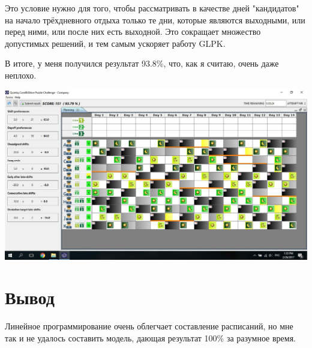 \documentclass[]{article}
\begin{document}
Это условие нужно для того, чтобы рассматривать в качестве дней "кандидатов" на
начало трёхдневного отдыха только те дни, которые являются выходными, или перед
ними, или после них есть выходной. Это сокращает множество допустимых решений,
и тем самым ускоряет работу GLPK.

В итоге, у меня получился результат 93.8\%, что, как я считаю, очень даже неплохо.

\includegraphics[scale=0.5]{bus_res.jpg}
\section{Вывод}
Линейное программирование очень облегчает составление расписаний, но мне так
и не удалось составить модель, дающая результат 100\% за разумное время.
\end{document}
